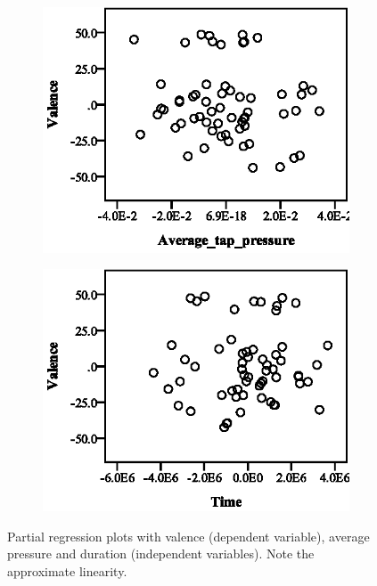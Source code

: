 \begin{figure}[ht]
  \centering
  \begin{subfigure}[b]{0.45\textwidth}
    \centering
    \includegraphics[width=\textwidth]{images/linearity/partialregression/valence/ValAvgAvg.eps}
    \label{fig:valavgavg}
  \end{subfigure}
  \quad
  \begin{subfigure}[b]{0.45\textwidth}
    \centering
    \includegraphics[width=\textwidth]{images/linearity/partialregression/valence/ValAvgTime.eps}
    \label{fig:valavgtime}
  \end{subfigure}
  \caption{Partial regression plots with valence (dependent variable), average pressure and duration (independent variables). Note the approximate linearity.}
\end{figure}